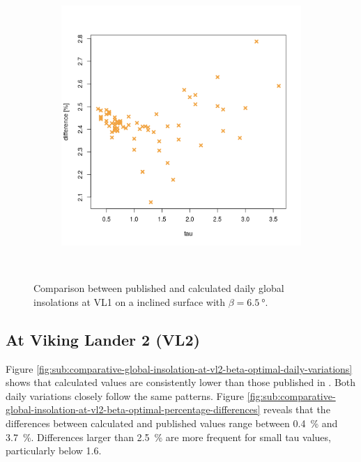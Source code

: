 \begin{figure}[H]
\begin{subfigure}[t]{\subfigureWidth}
    \end{subfigure}\hfill
    \begin{subfigure}[t]{\subfigureWidth}
        \centering
            \includegraphics[height=\graphicsHeight]{sections/appendix/A/plots/h-diff-bet-exp-calc-at-vl1-with-beta-65-deg.png}
            \label{fig:sub:comparative-global-insolation-at-vl1-beta-optimal-percentage-differences}
    \end{subfigure}\\[0.8ex]
    \caption{Comparison between published and calculated daily global insolations at VL1 on a inclined surface with $\beta=\SI{6.5}{\degree}$.}
    \label{fig:plot:comparative-global-insolation-at-vl1-beta-optimal}
\vspace{-2ex}
\end{figure}

\subsection{At Viking Lander 2 (VL2)}
Figure \ref{fig:sub:comparative-global-insolation-at-vl2-beta-optimal-daily-variations} shows that calculated values are consistently lower than those published in . Both daily variations closely follow the same patterns. Figure \ref{fig:sub:comparative-global-insolation-at-vl2-beta-optimal-percentage-differences} reveals that the differences between calculated and published values range between \SI{0.4}{\percent} and \SI{3.7}{\percent}. Differences larger than \SI{2.5}{\percent} are more frequent for small tau values, particularly below 1.6.

